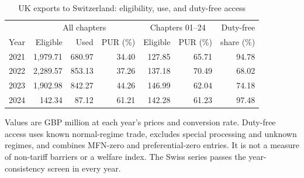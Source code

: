 \begin{table}[!htbp]
\centering
\caption{UK exports to Switzerland: eligibility, use, and duty-free access}\label{tab:swiss}
\small
\begin{tabular}{lrrrrrr}
\toprule
 & \multicolumn{3}{c}{All chapters} & \multicolumn{2}{c}{Chapters 01--24} & Duty-free \\
Year & Eligible & Used & PUR (\%) & Eligible & PUR (\%) & share (\%) \\
\midrule
2021 & 1,979.71 & 680.97 & 34.40 & 127.85 & 65.71 & 94.78 \\
2022 & 2,289.57 & 853.13 & 37.26 & 137.18 & 70.49 & 68.02 \\
2023 & 1,902.98 & 842.27 & 44.26 & 146.99 & 62.04 & 74.18 \\
2024 & 142.34 & 87.12 & 61.21 & 142.28 & 61.23 & 97.48 \\
\bottomrule
\end{tabular}
\par\vspace{3pt}\begin{minipage}{.97\linewidth}\footnotesize Values are GBP million at each year's prices and conversion rate. Duty-free access uses known normal-regime trade, excludes special processing and unknown regimes, and combines MFN-zero and preferential-zero entries. It is not a measure of non-tariff barriers or a welfare index. The Swiss series passes the year-consistency screen in every year.\end{minipage}
\end{table}
